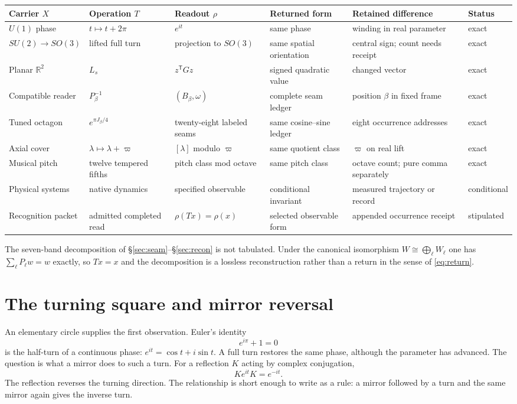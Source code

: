 \documentclass[10pt]{article}
\newcommand{\R}{\mathbb R}
\begin{document}
\begingroup\scriptsize
\setlength{\tabcolsep}{3pt}
\begin{longtable}{@{}p{.115\linewidth}p{.15\linewidth}p{.17\linewidth}p{.16\linewidth}p{.16\linewidth}p{.12\linewidth}@{}}
\toprule Carrier $X$ & Operation $T$ & Readout $\rho$ & Returned form & Retained difference & Status \\ \midrule\endhead
$U(1)$ phase & $t\mapsto t+2\pi$ & $e^{it}$ & same phase & winding in real parameter & exact \\
$SU(2)\to SO(3)$ & lifted full turn & projection to $SO(3)$ & same spatial orientation & central sign; count needs receipt & exact \\
Planar $\R^2$ & $L_s$ & $z^\mathsf{T}Gz$ & signed quadratic value & changed vector & exact \\
Compatible reader & $P_\beta^{-1}$ & $(B_\beta,\omega)$ & complete seam ledger & position $\beta$ in fixed frame & exact \\
Tuned octagon & $e^{\pi J_\beta/4}$ & twenty-eight labeled seams & same cosine--sine ledger & eight occurrence addresses & exact \\
Axial cover & $\lambda\mapsto\lambda+\varpi$ & $[\lambda]$ modulo $\varpi$ & same quotient class & $\varpi$ on real lift & exact \\
Musical pitch & twelve tempered fifths & pitch class mod octave & same pitch class & octave count; pure comma separately & exact \\
Physical systems & native dynamics & specified observable & conditional invariant & measured trajectory or record & conditional \\
Recognition packet & admitted completed read & $\rho(Tx)=\rho(x)$ & selected observable form & appended occurrence receipt & stipulated \\
\bottomrule
\end{longtable}
\endgroup

The seven-band decomposition of \S\ref{sec:seam}--\S\ref{sec:recon} is not tabulated. Under the canonical isomorphism $W\cong\bigoplus_\ell W_\ell$ one has $\sum_\ell P_\ell w=w$ exactly, so $Tx=x$ and the decomposition is a lossless reconstruction rather than a return in the sense of \eqref{eq:return}.

\section{The turning square and mirror reversal}\label{sec:turn}
An elementary circle supplies the first observation. Euler's identity
\[
e^{i\pi}+1=0
\]
is the half-turn of a continuous phase: $e^{it}=\cos t+i\sin t$.
A full turn restores the same phase, although the parameter has advanced.
The question is what a mirror does to such a turn. For a reflection $K$
acting by complex conjugation,
\[
K e^{it}K=e^{-it}.
\]
The reflection reverses the turning direction. The relationship is
short enough to write as a rule: a mirror followed by a turn and the
same mirror again gives the inverse turn.
\end{document}

